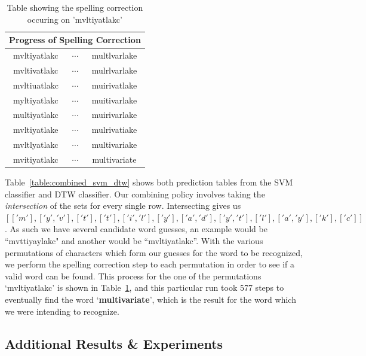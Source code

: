 \documentclass[12pt]{article}
\begin{document}
	\begin{table}[htp!]
\begin{center}	
\begin{tabular}[c]{|c|c|c|}
  \hline
  \multicolumn{3}{|c|}{Progress of Spelling Correction}  \\
  \hline
  mvltiyatlakc & $\cdots$ & multlvarlake \\
  mvltivatlakc & $\cdots$ & mulrlvarlake \\
  mvltiuatlakc & $\cdots$ & muirivatlake \\
  myltiyatlakc & $\cdots$ & muitivarlake \\
  multiyatlakc & $\cdots$ & muirivarlake \\
  mvltiyatlake & $\cdots$ & mulrivatiake \\
  mvltlyatlakc & $\cdots$ & multivariake \\
  mvitiyatlakc & $\cdots$ & multivariate \\ 
  \hline
\end{tabular}
\caption{Table showing the spelling correction occuring on 'mvltiyatlakc'}
 \label{table:spellcheck}
\end{center}
\end{table}

	Table~\ref{table:combined_svm_dtw} shows both prediction tables from the SVM classifier and DTW classifier. Our combining policy involves taking the \textit{intersection} of the sets for every single row. Intersecting gives us $[['m'], ['y', 'v'], ['t'], ['t'], ['i', 'l'], ['y'], ['a', 'd'], ['y', 't'], ['l'], ['a', 'y'], ['k'], ['c']]$. As such we have several candidate word guesses, an example would be ``mvttiyaylakc" and another would be ``mvltiyatlakc''. With the various permutations of characters which form our guesses for the word to be recognized, we perform the spelling correction step to each permutation in order to see if a valid word can be found. This process for the one of the permutations `mvltiyatlakc' is shown in Table~\ref{table:spellcheck}, and this particular run took 577 steps to eventually find the word `\textbf{multivariate}', which is the result for the word which we were intending to recognize. 

	



	
	\subsection{Additional Results \& Experiments}
	\label{subsection:results:additional}
	
\end{document}
